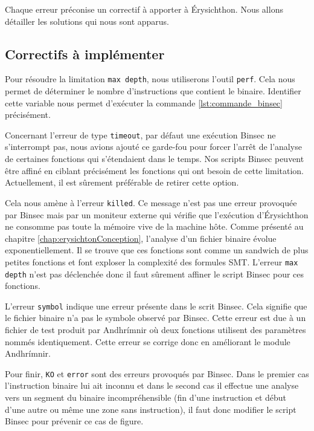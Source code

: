 Chaque erreur préconise un correctif à apporter à Érysichthon. Nous allons détailler les solutions qui nous sont apparus.

\subsection*{Correctifs à implémenter}

Pour résoudre la limitation \texttt{max depth}, nous utiliserons l'outil \texttt{perf}. Cela nous permet de déterminer le nombre d'instructions que contient le binaire. Identifier cette variable nous permet d'exécuter la commande \ref{lst:commande_binsec} précisément.\smallbreak

Concernant l'erreur de type \texttt{timeout}, par défaut une exécution Binsec ne s'interrompt pas, nous avions ajouté ce garde-fou pour forcer l'arrêt de l'analyse de certaines fonctions qui s'étendaient dans le temps. Nos scripts Binsec peuvent être affiné en ciblant précisément les fonctions qui ont besoin de cette limitation. Actuellement, il est sûrement préférable de retirer cette option.\smallbreak

Cela nous amène à l'erreur \texttt{killed}. Ce message n'est pas une erreur provoquée par Binsec mais par un moniteur externe qui vérifie que l'exécution d'Érysichthon ne consomme pas toute la mémoire vive de la machine hôte. Comme présenté au chapitre \ref{chap:erysichtonConception}, l'analyse d'un fichier binaire évolue exponentiellement. Il se trouve que ces fonctions sont comme un sandwich de plus petites fonctions et font exploser la complexité des formules SMT. L'erreur \texttt{max depth} n'est pas déclenchée donc il faut sûrement affiner le script Binsec pour ces fonctions.

L'erreur \texttt{symbol} indique une erreur présente dans le scrit Binsec. Cela signifie que le fichier binaire n'a pas le symbole observé par Binsec. Cette erreur est due à un fichier de test produit par Andhrímnir où deux fonctions utilisent des paramètres nommés identiquement. Cette erreur se corrige donc en améliorant le module Andhrímnir.

Pour finir, \texttt{KO} et \texttt{error} sont des erreurs provoqués par Binsec. Dans le premier cas l'instruction binaire lui ait inconnu et dans le second cas il effectue une analyse vers un segment du binaire incompréhensible (fin d'une instruction et début d'une autre ou même une zone sans instruction), il faut donc modifier le script Binsec pour prévenir ce cas de figure.


